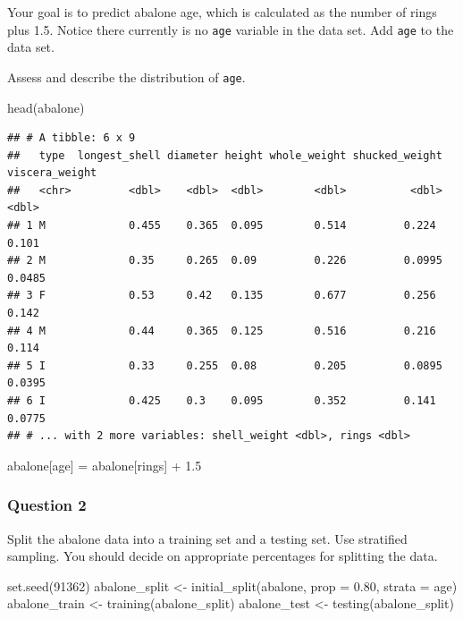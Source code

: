 \documentclass[
]{article}
\newenvironment{Shaded}{\begin{snugshade}}{\end{snugshade}}
\newcommand{\AttributeTok}[1]{\textcolor[rgb]{0.77,0.63,0.00}{#1}}
\newcommand{\DecValTok}[1]{\textcolor[rgb]{0.00,0.00,0.81}{#1}}
\newcommand{\FloatTok}[1]{\textcolor[rgb]{0.00,0.00,0.81}{#1}}
\newcommand{\FunctionTok}[1]{\textcolor[rgb]{0.00,0.00,0.00}{#1}}
\newcommand{\NormalTok}[1]{#1}
\newcommand{\OtherTok}[1]{\textcolor[rgb]{0.56,0.35,0.01}{#1}}
\newcommand{\SpecialCharTok}[1]{\textcolor[rgb]{0.00,0.00,0.00}{#1}}
\newcommand{\StringTok}[1]{\textcolor[rgb]{0.31,0.60,0.02}{#1}}
\begin{document}
Your goal is to predict abalone age, which is calculated as the number
of rings plus 1.5. Notice there currently is no \texttt{age} variable in
the data set. Add \texttt{age} to the data set.

Assess and describe the distribution of \texttt{age}.

\begin{Shaded}
\begin{Highlighting}[]
\FunctionTok{head}\NormalTok{(abalone)}
\end{Highlighting}
\end{Shaded}

\begin{verbatim}
## # A tibble: 6 x 9
##   type  longest_shell diameter height whole_weight shucked_weight viscera_weight
##   <chr>         <dbl>    <dbl>  <dbl>        <dbl>          <dbl>          <dbl>
## 1 M             0.455    0.365  0.095        0.514         0.224          0.101 
## 2 M             0.35     0.265  0.09         0.226         0.0995         0.0485
## 3 F             0.53     0.42   0.135        0.677         0.256          0.142 
## 4 M             0.44     0.365  0.125        0.516         0.216          0.114 
## 5 I             0.33     0.255  0.08         0.205         0.0895         0.0395
## 6 I             0.425    0.3    0.095        0.352         0.141          0.0775
## # ... with 2 more variables: shell_weight <dbl>, rings <dbl>
\end{verbatim}

\begin{Shaded}
\begin{Highlighting}[]
\NormalTok{abalone[}\StringTok{\textquotesingle{}age\textquotesingle{}}\NormalTok{] }\OtherTok{=}\NormalTok{ abalone[}\StringTok{\textquotesingle{}rings\textquotesingle{}}\NormalTok{] }\SpecialCharTok{+} \FloatTok{1.5}
\end{Highlighting}
\end{Shaded}

\hypertarget{question-2}{%
\subsubsection{Question 2}\label{question-2}}

Split the abalone data into a training set and a testing set. Use
stratified sampling. You should decide on appropriate percentages for
splitting the data.

\begin{Shaded}
\begin{Highlighting}[]
\FunctionTok{set.seed}\NormalTok{(}\DecValTok{91362}\NormalTok{)}
\NormalTok{abalone\_split }\OtherTok{\textless{}{-}} \FunctionTok{initial\_split}\NormalTok{(abalone, }\AttributeTok{prop =} \FloatTok{0.80}\NormalTok{, }\AttributeTok{strata =} \StringTok{\textquotesingle{}age\textquotesingle{}}\NormalTok{)}
\NormalTok{abalone\_train }\OtherTok{\textless{}{-}} \FunctionTok{training}\NormalTok{(abalone\_split)}
\NormalTok{abalone\_test }\OtherTok{\textless{}{-}} \FunctionTok{testing}\NormalTok{(abalone\_split)}
\end{Highlighting}
\end{Shaded}
\end{document}
